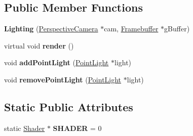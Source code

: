 \subsection*{Public Member Functions}
\begin{DoxyCompactItemize}
\item 
\hypertarget{class_lighting_ac786f1b90379f996f8d99e1e4bcd9e6f}{}{\bfseries Lighting} (\hyperlink{class_perspective_camera}{Perspective\+Camera} $\ast$cam, \hyperlink{class_framebuffer}{Framebuffer} $\ast$g\+Buffer)\label{class_lighting_ac786f1b90379f996f8d99e1e4bcd9e6f}

\item 
\hypertarget{class_lighting_a139c84b1a180648b41694b47f281981b}{}virtual void {\bfseries render} ()\label{class_lighting_a139c84b1a180648b41694b47f281981b}

\item 
\hypertarget{class_lighting_a124e1e665b5907faf9c52bd851f1a417}{}void {\bfseries add\+Point\+Light} (\hyperlink{class_point_light}{Point\+Light} $\ast$light)\label{class_lighting_a124e1e665b5907faf9c52bd851f1a417}

\item 
\hypertarget{class_lighting_a7d78793f7c5e3eb05b222309b7d8c617}{}void {\bfseries remove\+Point\+Light} (\hyperlink{class_point_light}{Point\+Light} $\ast$light)\label{class_lighting_a7d78793f7c5e3eb05b222309b7d8c617}

\end{DoxyCompactItemize}
\subsection*{Static Public Attributes}
\begin{DoxyCompactItemize}
\item 
\hypertarget{class_lighting_add6b069bd3d0f36eee753fe3470fe22d}{}static \hyperlink{class_shader}{Shader} $\ast$ {\bfseries S\+H\+A\+D\+E\+R} = 0\label{class_lighting_add6b069bd3d0f36eee753fe3470fe22d}

\end{DoxyCompactItemize}
